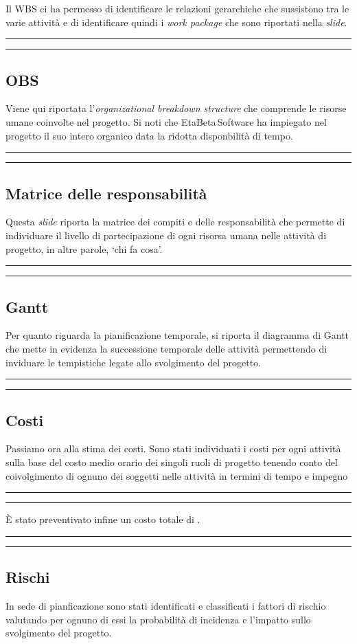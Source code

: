 \documentclass[a4paper,10pt]{article}
\newcommand{\inglese}[1]{\foreignlanguage{english}{\textit{#1}}}
\newcommand{\team}{\textsf{EtaBeta\,Software}\xspace}
\newcommand{\cambioslide}{%
\begin{center}
\Large
\rule[4pt]{0.2\linewidth}{.7pt} \ding{167} \rule[4pt]{0.2\linewidth}{.7pt}
\end{center}
}
\begin{document}
Il WBS ci ha permesso di identificare le relazioni gerarchiche che sussistono tra le varie attività e di identificare quindi i \inglese{work package} che sono riportati nella \inglese{slide}.

\cambioslide

\subsection{OBS}
Viene qui riportata l'\inglese{organizational breakdown structure} che comprende le risorse umane coinvolte nel progetto. Si noti che \team ha impiegato nel progetto il suo intero organico data la ridotta disponbilità di tempo.

\cambioslide

\subsection{Matrice delle responsabilità}
Questa \inglese{slide} riporta la matrice dei compiti e delle responsabilità che permette di individuare il livello di partecipazione di ogni risorsa umana nelle attività di progetto, in altre parole, `chi fa cosa'.

\cambioslide

\subsection{Gantt}
Per quanto riguarda la pianificazione temporale, si riporta il diagramma di Gantt che mette in evidenza la successione temporale delle attività permettendo di inviduare le tempistiche legate allo svolgimento del progetto.

\cambioslide

\subsection{Costi}
Passiamo ora alla stima dei costi. Sono stati individuati i costi per ogni attività sulla base del costo medio orario dei singoli ruoli di progetto tenendo conto del coivolgimento di ognuno dei soggetti nelle attività in termini di tempo e impegno

\cambioslide

È stato preventivato infine un costo totale di .

\cambioslide

\subsection{Rischi}
In sede di pianficazione sono stati identificati e classificati i fattori di rischio valutando per ognuno di essi la probabilità di incidenza e l'impatto sullo svolgimento del progetto.
\end{document}
